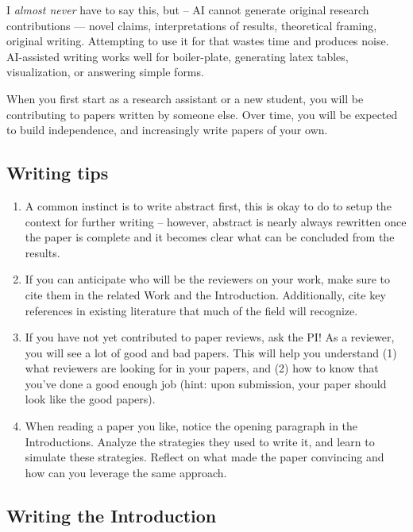\documentclass[11pt, letterpaper]{article}
\begin{document}
\vspace{1cm}

I \textit{almost never} have to say this, but -- AI cannot generate original research contributions — novel claims, interpretations of results, theoretical framing, original writing. Attempting to use it for that wastes time and produces noise. AI-assisted writing works well for boiler-plate, generating latex tables, visualization, or answering simple forms. 

When you first start as a research assistant or a new student, you will be contributing to papers written by someone else. Over time, you will be expected to build independence, and increasingly write papers of your own. 

\subsection{Writing tips}

\begin{enumerate}
    \item A common instinct is to write abstract first, this is okay to do to setup the context for further writing -- however, abstract is nearly always rewritten once the paper is complete and it becomes clear what can be concluded from the results.
\item If you can anticipate who will be the reviewers on your work, make sure to cite them in the related Work and the Introduction. Additionally, cite key references in existing literature that much of the field will recognize. 
\item If you have not yet contributed to paper reviews, ask the PI! As a reviewer, you will see a lot of good and bad papers. This will help you understand (1) what reviewers are looking for in your papers, and (2) how to know that you've done a good enough job (hint: upon submission, your paper should look like the good papers).
\item When reading a paper you like, notice the opening paragraph in the Introductions. Analyze the strategies they used to write it, and learn to simulate these strategies. Reflect on what made the paper convincing and how can you leverage the same approach.
\end{enumerate}

\subsection{Writing the Introduction } 
\end{document}
